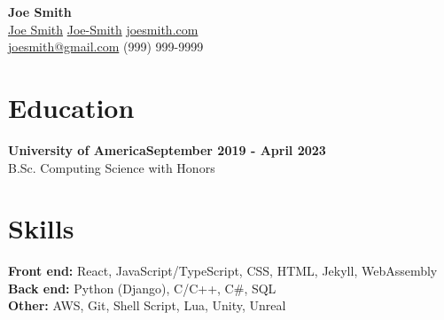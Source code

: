 \documentclass[letterpaper,11pt]{article}
\begin{document}
\begin{center} 
{\Large \textbf{Joe Smith}}\\
\vspace{1px}
{\footnotesize
{} \hspace{1px} \href{https://github.com/Joe-Smith}{Joe Smith}
\hspace{8px}
 \hspace{.1px} \href{https://www.linkedin.com/in/Joe-Smith/}{Joe-Smith}
\hspace{8px}  \hspace{1px} \href{https://joesmith.com}{joesmith.com}
\hspace{8px}
}\\
{\footnotesize
{} \hspace{1px} \href{mailto:joesmith@gmail.com}{joesmith@gmail.com}
\hspace{8px} 
 \hspace{1px}
(999) 999-9999
}
\end{center}
\vspace{-5pt}

\section{\color{blue}Education}
\vspace{5pt}

\begin{addmargin}[1em]{2em}%
\textbf{University of America}\hfill \textbf{September 2019 - April 2023}\\
\setlength\parindent{1cm} B.Sc. Computing Science with Honors
\end{addmargin}
\vspace{5pt}

\section{\color{blue}Skills}
\vspace{5pt}
\begin{addmargin}[1em]{2em}%
\noindent \textbf{Front end:} React, JavaScript/TypeScript, CSS, HTML, Jekyll, WebAssembly\\
\noindent \textbf{Back end:} Python (Django), C/C++, C\#, SQL\\
\noindent \textbf{Other:} AWS, Git, Shell Script, Lua, Unity, Unreal
\end{addmargin}
\vspace{5pt}
\end{document}
